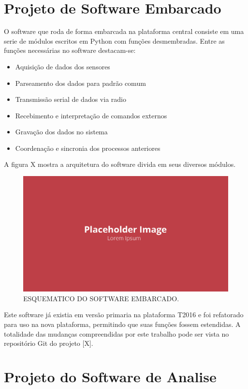\section{Projeto de Software Embarcado}

O software que roda de forma embarcada na plataforma central consiste em uma serie de módulos escritos em Python com funções desmembradas. Entre as funções necessárias no software destacam-se:

\begin{itemize}
    \item Aquisição de dados dos sensores
    \item Parseamento dos dados para padrão comum
    \item Transmissão serial de dados via radio
    \item Recebimento e interpretação de comandos externos
    \item Gravação dos dados no sistema
    \item Coordenação e sincronia dos processos anteriores
\end{itemize}

A figura X mostra a arquitetura do software divida em seus diversos módulos.

\begin{figure}[!ht]
    \centering
    \includegraphics[width=.8\linewidth]{figuras/placeholder.png}
    \caption{ESQUEMATICO DO SOFTWARE EMBARCADO\cite{autor}.}
    \label{fig:placeholder}
\end{figure}

Este software já existia em versão primaria na plataforma T2016 e foi refatorado para uso na nova plataforma, permitindo que suas funções fossem estendidas. A totalidade das mudanças compreendidas por este trabalho pode ser vista no repositório Git do projeto [X]. 
\section{Projeto do Software de Analise}

